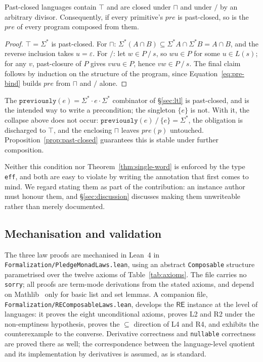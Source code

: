 \documentclass[acmsmall,screen]{acmart}
\newcommand{\RE}{\mathsf{RE}}
\newcommand{\pre}{\mathit{pre}}
\newcommand{\previously}[1]{\mathtt{previously}(#1)}
\newcommand{\rquot}{\mathbin{/}}           %
\begin{document}
\begin{proposition}[Closure]
\label{prop:past-closed}
Past-closed languages contain $\top$ and are closed under $\sqcap$ and
under $\rquot$ by an arbitrary divisor.
Consequently, if every primitive's $\pre$ is past-closed, so is the $\pre$
of every program composed from them.
\end{proposition}
\begin{proof}
$\top = \Sigma^*$ is past-closed.
For $\sqcap$: $\Sigma^*(A \cap B) \subseteq \Sigma^*A \cap \Sigma^*B
= A \cap B$, and the reverse inclusion takes $u = \varepsilon$.
For $\rquot$: let $w \in P \rquot s$, so $wu \in P$ for some $u \in L(s)$;
for any $v$, past-closure of $P$ gives $vwu \in P$, hence
$vw \in P \rquot s$.
The final claim follows by induction on the structure of the program, since
Equation~\eqref{eq:pre-bind} builds $\pre$ from $\sqcap$ and $\rquot$ alone.
\end{proof}

The $\previously{e} = \Sigma^* \cdot e \cdot \Sigma^*$ combinator of
\S\ref{sec:ltl} is past-closed, and is the intended way to write a
precondition; the singleton $\{e\}$ is not.
With it, the collapse above does not occur: $\previously{e} \rquot \{e\}
= \Sigma^*$, the obligation is discharged to $\top$, and the enclosing
$\sqcap$ leaves $\pre(p)$ untouched.
Proposition~\ref{prop:past-closed} guarantees this is stable under further
composition.

Neither this condition nor Theorem~\ref{thm:single-word} is enforced by the
type \lstinline{eff}, and both are easy to violate by writing the
annotation that first comes to mind.
We regard stating them as part of the contribution: an instance author must
honour them, and \S\ref{sec:discussion} discusses making them
unwriteable rather than merely documented.

\subsection{Mechanisation and validation}
\label{sec:mechanisation}

The three law proofs are mechanised in Lean~4 in
\texttt{Formalization/PledgeMonadLaws.lean}, using an abstract
\lstinline{Composable} structure parametrised over the twelve axioms of
Table~\ref{tab:axioms}.
The file carries no \lstinline{sorry}; all proofs are term-mode derivations
from the stated axioms, and depend on Mathlib~\cite{mathlib4} only for
basic list and set lemmas.
A companion file, \texttt{Formalization/REComposableLaws.lean}, develops the
$\RE$ instance at the level of languages: it proves the eight unconditional
axioms, proves L2 and R2 under the non-emptiness hypothesis, proves the
$\subseteq$ direction of L4 and R4, and exhibits the counterexample to the
converse.
Derivative correctness and \lstinline{nullable} correctness are proved
there as well; the correspondence between the language-level quotient and
its implementation by derivatives is assumed, as is standard.
\end{document}

